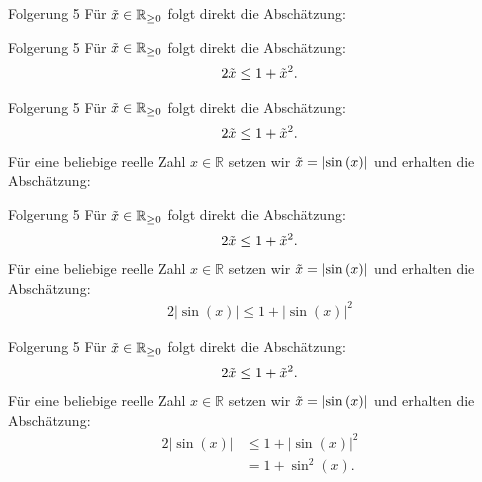 \documentclass[10pt]{beamer}
\def\bR{\mathbb{R}}
\begin{document}
\begin{frame}{Folgerung 5}
    Für \( \Tilde{x} \in \bR_{\geq 0} \) folgt direkt die Abschätzung:
\end{frame}



\begin{frame}{Folgerung 5}
    Für \( \Tilde{x} \in \bR_{\geq 0} \) folgt direkt die Abschätzung:
    \begin{align*}
        2 \Tilde{x}
        \leq 1 + \Tilde{x}^{2}.
    \end{align*}
\end{frame}



\begin{frame}{Folgerung 5}
    Für \( \Tilde{x} \in \bR_{\geq 0} \) folgt direkt die Abschätzung:
    \begin{align*}
        2 \Tilde{x}
        \leq 1 + \Tilde{x}^{2}.
    \end{align*}
    Für eine beliebige reelle Zahl \( x \in \bR \) setzen wir \( \Tilde{x} = \left\vert \sin\left( x \right) \right\vert \) und erhalten die Abschätzung:
\end{frame}



\begin{frame}{Folgerung 5}
    Für \( \Tilde{x} \in \bR_{\geq 0} \) folgt direkt die Abschätzung:
    \begin{align*}
        2 \Tilde{x}
        \leq 1 + \Tilde{x}^{2}.
    \end{align*}
    Für eine beliebige reelle Zahl \( x \in \bR \) setzen wir \( \Tilde{x} = \left\vert \sin\left( x \right) \right\vert \) und erhalten die Abschätzung:
    \begin{align*}
        2 \left\vert \sin\left( x \right) \right\vert
        \leq 1 + \left\vert \sin\left( x \right) \right\vert^{2}
    \end{align*}
\end{frame}



\begin{frame}{Folgerung 5}
    Für \( \Tilde{x} \in \bR_{\geq 0} \) folgt direkt die Abschätzung:
    \begin{align*}
        2 \Tilde{x}
        \leq 1 + \Tilde{x}^{2}.
    \end{align*}
    Für eine beliebige reelle Zahl \( x \in \bR \) setzen wir \( \Tilde{x} = \left\vert \sin\left( x \right) \right\vert \) und erhalten die Abschätzung:
    \begin{align*}
        2 \left\vert \sin\left( x \right) \right\vert
        & \leq 1 + \left\vert \sin\left( x \right) \right\vert^{2} \\
        & = 1 + \sin^{2}\left( x \right).
    \end{align*}
\end{frame}
\end{document}
